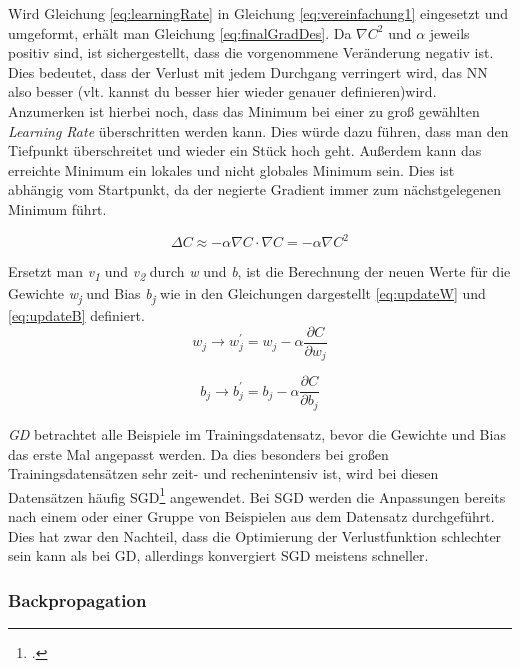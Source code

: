 Wird Gleichung \ref{eq:learningRate} in Gleichung \ref{eq:vereinfachung1} eingesetzt und umgeformt, erhält man Gleichung \ref{eq:finalGradDes}. Da  $\nabla C^2$ und $\alpha$ jeweils positiv sind, ist sichergestellt, dass die vorgenommene Veränderung negativ ist. Dies bedeutet, dass der Verlust mit jedem Durchgang verringert wird, das \ac{NN} also besser (vlt. kannst du besser hier wieder genauer definieren)wird. Anzumerken ist hierbei noch, dass das Minimum bei einer zu groß gewählten \textit{Learning Rate} überschritten werden kann. Dies würde dazu führen, dass man den Tiefpunkt überschreitet und wieder ein Stück hoch geht. Außerdem kann das erreichte Minimum ein lokales und nicht globales Minimum sein. Dies ist abhängig vom Startpunkt, da der negierte Gradient immer zum nächstgelegenen Minimum führt.

\begin{equation} \label{eq:finalGradDes}
    \Delta C \approx -\alpha \nabla C \cdot  \nabla C =  -\alpha \nabla C^2
\end{equation}

Ersetzt man \textit{v\textsubscript{1}} und \textit{v\textsubscript{2}} durch \textit{w} und \textit{b}, ist die Berechnung der neuen Werte für die Gewichte \textit{w\textsubscript{j}} und Bias \textit{b\textsubscript{j}} wie in den Gleichungen dargestellt \ref{eq:updateW} und \ref{eq:updateB} definiert.
\begin{equation} \label{eq:updateW}
    w_{j} \rightarrow w_{j}^{'} = w_{j} - \alpha \frac{\partial C}{\partial w_{j}}
\end{equation}

\begin{equation} \label{eq:updateB}
    b_{j} \rightarrow b_{j}^{'} = b_{j} - \alpha \frac{\partial C}{\partial b_{j}}
\end{equation}

\textit{\ac{GD}} betrachtet alle Beispiele im Trainingsdatensatz, bevor die Gewichte und Bias das erste Mal angepasst werden. Da dies  besonders bei großen Trainingsdatensätzen sehr zeit- und rechenintensiv ist, wird bei diesen Datensätzen häufig \ac{SGD}\footcite[Vgl. ][S. 400 ff.]{robbinsStochasticApproximationMethod1951}  angewendet. Bei \ac{SGD} werden die Anpassungen bereits nach einem oder einer Gruppe von Beispielen aus dem Datensatz durchgeführt. Dies hat zwar den Nachteil, dass die Optimierung der Verlustfunktion schlechter sein kann als bei \ac{GD}, allerdings konvergiert \ac{SGD} meistens schneller.

\subsubsection{Backpropagation}

